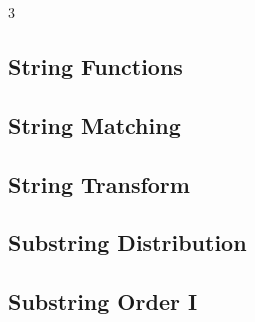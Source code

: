 \documentclass[8pt]{extarticle}
\begin{document}
\begin{multicols*}{3}
\subsection{String Functions}
\begin{caixaenunciado}

\end{caixaenunciado}
\vspace{0.3cm}


\subsection{String Matching}
\begin{caixaenunciado}

\end{caixaenunciado}
\vspace{0.3cm}


\subsection{String Transform}
\begin{caixaenunciado}

\end{caixaenunciado}
\vspace{0.3cm}


\subsection{Substring Distribution}
\begin{caixaenunciado}

\end{caixaenunciado}
\vspace{0.3cm}


\subsection{Substring Order I}
\begin{caixaenunciado}

\end{caixaenunciado}
\vspace{0.3cm}



\end{multicols*}
\end{document}
